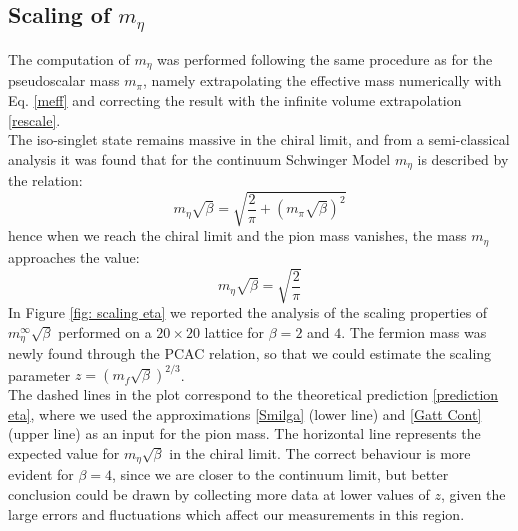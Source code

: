 \subsection{Scaling of $m_\eta$}
The computation of $m_\eta$ was performed following the same procedure as for the pseudoscalar mass $m_\pi$, namely extrapolating the effective mass numerically with Eq. \eqref{meff} and correcting the result with the infinite volume extrapolation \eqref{rescale}.
\\ The iso-singlet state remains massive in the chiral limit, and from a semi-classical analysis it was found that for the continuum Schwinger Model $m_\eta$ is described by the relation:
\begin{equation}\label{prediction eta}
    m_\eta \sqrt{\beta} = \sqrt{\frac{2}{\pi} + \left(m_\pi \sqrt{\beta}\right)^2}
\end{equation}
hence when we reach the chiral limit and the pion mass vanishes, the mass $m_\eta$ approaches the value:
\begin{equation}
    m_\eta \sqrt{\beta} = \sqrt{\frac{2}{\pi}}
\end{equation}
In Figure \eqref{fig: scaling eta} we reported the analysis of the scaling properties of $m_\eta^{\infty}\sqrt{\beta}$ performed on a $20 \times 20$ lattice for $\beta = 2$ and $4$. The fermion mass was newly found through the PCAC relation, so that we could estimate the scaling parameter $z = (m_f \sqrt{\beta})^{2/3}$. 
\\ The dashed lines in the plot correspond to the theoretical prediction \eqref{prediction eta}, where we used the approximations \eqref{Smilga} (lower line) and \eqref{Gatt Cont} (upper line) as an input for the pion mass. The horizontal line represents the expected value for $m_\eta \sqrt{\beta}$ in the chiral limit. The correct behaviour is more evident for $\beta = 4$, since we are closer to the continuum limit, but better conclusion could be drawn by collecting more data at lower values of $z$, given the large errors and fluctuations which affect our measurements in this region.

